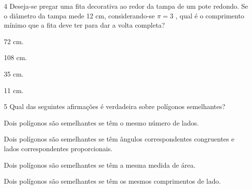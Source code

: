 


\pagebreak

\num{4} Deseja-se pregar uma fita decorativa ao redor da tampa de um pote
redondo. Se o diâmetro da tampa mede 12 cm, considerando-se $\pi = 3$ , qual é o comprimento mínimo
que a fita deve ter para dar a volta completa?

\begin{escolha}
\item 72 cm.
\item 108 cm.
\item 35 cm.
\item 11 cm.
\end{escolha}







\num{5} Qual das seguintes afirmações é verdadeira sobre polígonos
semelhantes?

\begin{escolha}
\item Dois polígonos são semelhantes se têm o mesmo número de lados.
\item Dois polígonos são semelhantes se têm ângulos correspondentes
congruentes e lados correspondentes proporcionais.
\item Dois polígonos são semelhantes se têm a mesma medida de área.
\item Dois polígonos são semelhantes se têm os mesmos comprimentos de lado.
\end{escolha}

